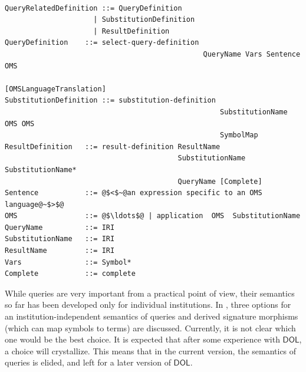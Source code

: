 \documentclass[10pt, a4paper]{isov2}
\newcommand*{\syntax}[1]{\texttt{#1}}
\newcommand{\semdom}[1]{
\begin{center}
\fbox{$#1$}
\end{center}
}
\newcommand*{\DOL}{\ensuremath{\mathsf{DOL}}\xspace}
\begin{document}


\begin{lstlisting}[language=ebnf,escapeinside={@@},mathescape]  % abstract syntax

QueryRelatedDefinition ::= QueryDefinition
                     | SubstitutionDefinition
                     | ResultDefinition
QueryDefinition    ::= select-query-definition
                                               QueryName Vars Sentence OMS
                                               [OMSLanguageTranslation]
SubstitutionDefinition ::= substitution-definition
                                                   SubstitutionName OMS OMS
                                                   SymbolMap
ResultDefinition   ::= result-definition ResultName
                                         SubstitutionName SubstitutionName*
                                         QueryName [Complete]
Sentence           ::= @$<$~@an expression specific to an OMS language@~$>$@ 
OMS                ::= @$\ldots$@ | application  OMS  SubstitutionName 
QueryName          ::= IRI
SubstitutionName   ::= IRI
ResultName         ::= IRI
Vars               ::= Symbol*
Complete           ::= complete
\end{lstlisting}


\label{s:sem-queries}

While queries are very important from a practical point of view, their
semantics so far has been developed only for individual institutions.
In \cite{MossakowskiEtAl15a}, three options for an
institution-independent semantics of queries and derived signature
morphisms (which can map symbols to terms) are discussed. Currently,
it is not clear which one would be the best choice. It is expected
that after some experience with \DOL, a choice will crystallize. This
means that in the current version, the semantics of queries is
elided, and left for a later version of \DOL.

%
%
%
%
\end{document}
